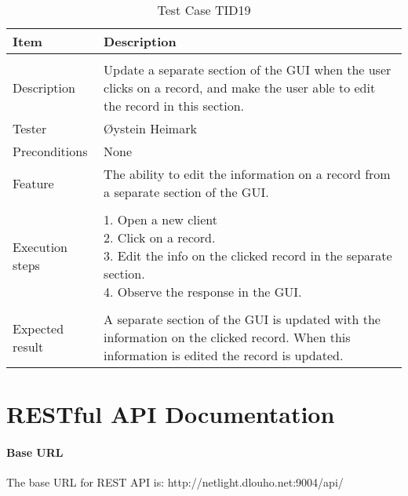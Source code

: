 \begin{table}
\caption{Test Case TID19}
\centering
\begin{tabular}{ l p{13cm} }
\hline 
 Item            & Description        \\ 
\hline \\ [-2.0ex]
 Description     &Update a separate section of the GUI when the user clicks on a record, and make the user able to edit the record in this section. \\ 
 Tester          & Øystein Heimark                  \\ 
 Preconditions   & None\\ 
 Feature         & The ability to edit the information on a record from a separate section of the GUI.   \vspace{3pt}                     \\ 
\hline \\ [-1.5ex]
 Execution steps & \pbox{13cm}{1. Open a new client \\ 2. Click on a record. \\ 3. Edit the info on the clicked record in the separate section. \\ 4. Observe the response in the GUI. } \vspace{3pt} \\
\hline \\ [-1.5ex]
 Expected result & A separate section of the GUI is updated with the information on the clicked record. When this information is edited the record is updated. \\
\hline 
\end{tabular}
\label{table:testcasetid19}
\end{table}

\clearpage

\chapter{RESTful API Documentation}

\subsubsection{Base URL}
The base URL for REST API is: http://netlight.dlouho.net:9004/api/

